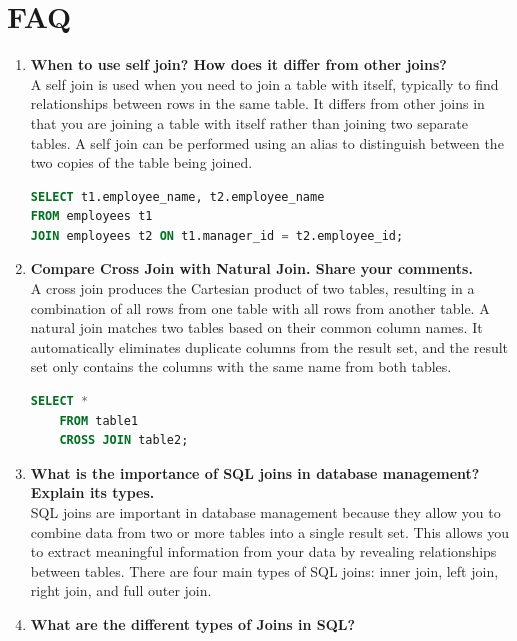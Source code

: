 \documentclass[11pt]{article}
\begin{document}
\section{FAQ}
\begin{enumerate}
	\item \textbf{When to use self join? How does it differ from other joins?}\\

	      A self join is used when you need to join a table with itself, typically to find relationships between rows in the same table. It differs from other joins in that you are joining a table with itself rather than joining two separate tables. A self join can be performed using an alias to distinguish between the two copies of the table being joined.


	      \begin{lstlisting}[language=sql]
SELECT t1.employee_name, t2.employee_name 
FROM employees t1 
JOIN employees t2 ON t1.manager_id = t2.employee_id;
\end{lstlisting}

	\item \textbf{Compare Cross Join with Natural Join. Share your comments.}\\

	      A cross join produces the Cartesian product of two tables, resulting in a combination of all rows from one table with all rows from another table. A natural join matches two tables based on their common column names. It automatically eliminates duplicate columns from the result set, and the result set only contains the columns with the same name from both tables.

	      \begin{lstlisting}[language=sql]
	SELECT *
	FROM table1
	CROSS JOIN table2;
\end{lstlisting}

	\item \textbf{What is the importance of SQL joins in database management? Explain its types.}\\

	      SQL joins are important in database management because they allow you to combine data from two or more tables into a single result set. This allows you to extract meaningful information from your data by revealing relationships between tables. There are four main types of SQL joins: inner join, left join, right join, and full outer join.


	\item \textbf{What are the different types of Joins in SQL?}\\


\end{enumerate}
\end{document}
